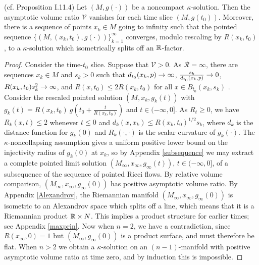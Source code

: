 \begin{proposition}
  \label{prop:kl-asymptotic-scalar-curvature-asymptotic-volume-ratio-existence-kappa-solutions}
 (cf. Proposition I.11.4) \label{propI.11.4}
Let $(M,g(\cdot))$ be a noncompact $\kappa$-solution.
Then the asymptotic volume ratio ${\mathcal V}$
vanishes for each time slice $(M,g(t_0))$.  Moreover, there is a
sequence of points $x_k\in M$ going to infinity such that the
pointed sequence $\{ (M,(x_k,t_0),g(\cdot)) \}_{k=1}^\infty$ converges,
modulo rescaling
by $R(x_k,t_0)$, to a $\kappa$-solution which isometrically splits off
an ${\mathbb R}$-factor.
\end{proposition}
\begin{proof}
Consider the time-$t_0$ slice.
Suppose that ${\mathcal V}>0$.
As ${\mathcal R}=\infty$,  there
are sequences $x_k\in M$ and  $s_k>0$
such that $d_{t_0}(x_k,p)\rightarrow \infty$, $\frac{s_k}{d_{t_0}(x_k,p)}\rightarrow 0$,
$R(x_k, t_0 )s_k^2\rightarrow\infty$, and $R(x, t_0)\leq 2R(x_k, t_0)$ for all
$x\in B_{t_0}(x_k,s_k)$
\cite[Lemma 22.2]{Hamilton}.
Consider the rescaled pointed solution
$(M,x_k,g_k(t))$ with
$g_k(t) =R(x_k,t_0) \: g(t_0 + \frac{t}{R(x_k,t_0)})$ and $t\in (-\infty,0]$.
As $R_t \ge 0$, we have
$R_k(x,t)\leq 2$ whenever $t\leq 0$ and
$d_k(x,x_k)\leq R(x_k, t_0)^{1/2} s_k$,
where $d_k$ is the distance function  for $g_k(0)$
and $R_k(\cdot,\cdot)$ is the scalar curvature of $g_k(\cdot)$.
The $\kappa$-noncollapsing assumption gives a uniform positive
lower bound on the
injectivity radius of $g_k(0)$ at $x_k$,
so by Appendix \ref{subsequence}
we may extract a complete pointed limit solution
$(M_\infty,x_\infty,g_\infty(t))$, $t\in (-\infty,0]$, of a subsequence of
the sequence of pointed Ricci flows.
By relative volume comparison, $(M_\infty,x_\infty,g_\infty(0))$
has positive asymptotic volume ratio.  By Appendix \ref{Alexandrov},
the Riemannian manifold
$(M_\infty,x_\infty,g_\infty(0))$ is isometric to an Alexandrov
space which splits off a line, which means that it is a Riemannian
product ${\mathbb R}\times N$. This implies a product structure for
earlier times;
see Appendix \ref{maxprin}.
Now when $n=2$, we have a contradiction,
since $R(x_\infty,0)=1$ but $(M_\infty,g_\infty(0))$ is a product
surface, and must therefore be flat.  When $n>2$ we obtain
a $\kappa$-solution on an $(n-1)$-manifold with positive asymptotic
volume ratio at time zero, and by induction this is impossible.
\end{proof}




